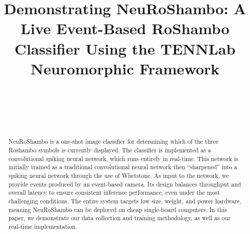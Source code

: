 \documentclass[conference]{IEEEtran}
\begin{document}
\title{Demonstrating NeuRoShambo: A Live Event-Based RoShambo Classifier Using the TENNLab Neuromorphic Framework %
}

\author{
\\\
\and
{}
\\
}

\maketitle

\begin{abstract}
NeuRoShambo is a one-shot image classifier for determining which of the three Roshambo symbols is currently displayed. The classifier is implemented as a convolutional spiking neural network, which runs entirely in real-time. This network is initially trained as a traditional convolutional neural network then ``sharpened'' into a spiking neural network through the use of Whetstone. As input to the network, we provide events produced by an event-based camera. Its design balances throughput and overall latency to ensure consistent inference performance, even under the most challenging conditions. The entire system targets low size, weight, and power hardware, meaning NeuRoShambo can be deployed on cheap single-board computers. In this paper, we demonstrate our data collection and training methodology, as well as our real-time implementation.
\end{abstract}
\end{document}
